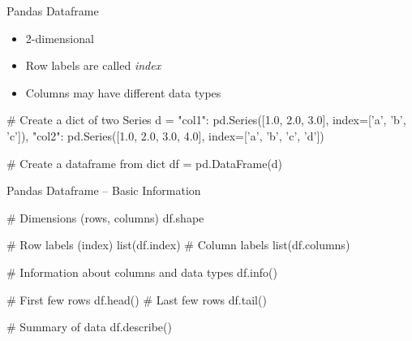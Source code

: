 \documentclass[ignorenonframetext,xcolor=x11names]{beamer}
\begin{document}

\begin{frame}[fragile]{Pandas Dataframe}
\begin{itemize}
   \item 2-dimensional
   \item Row labels are called \emph{index}
   \item Columns may have different data types
\end{itemize}
\footnotesize
\begin{pythoncode}
# Create a dict of two Series
d = {
    "col1": pd.Series([1.0, 2.0, 3.0], 
                index=['a', 'b', 'c']),
    "col2": pd.Series([1.0, 2.0, 3.0, 4.0], 
                index=['a', 'b', 'c', 'd'])
}

# Create a dataframe from dict
df = pd.DataFrame(d)
\end{pythoncode}
\end{frame}

\begin{frame}[fragile]{Pandas Dataframe -- Basic Information}
\footnotesize
\begin{pythoncode}
# Dimensions (rows, columns)
df.shape

# Row labels (index)
list(df.index)
# Column labels
list(df.columns)

# Information about columns and data types
df.info()

# First few rows
df.head()
# Last few rows
df.tail()

# Summary of data
df.describe()
\end{pythoncode}
\end{frame}




\end{document}
